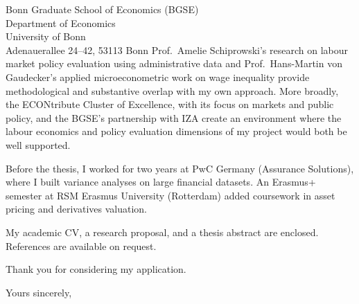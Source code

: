\documentclass[a4paper,11pt]{letter}
\begin{document}
\begin{letter}{%
    Bonn Graduate School of Economics (BGSE) \\
    Department of Economics \\
    University of Bonn \\
    Adenauerallee 24--42, 53113 Bonn
}
Prof.\ Amelie Schiprowski's research on labour market policy evaluation using administrative data and Prof.\ Hans-Martin von Gaudecker's applied microeconometric work on wage inequality provide methodological and substantive overlap with my own approach. More broadly, the ECONtribute Cluster of Excellence, with its focus on markets and public policy, and the BGSE's partnership with IZA create an environment where the labour economics and policy evaluation dimensions of my project would both be well supported.

Before the thesis, I worked for two years at PwC Germany (Assurance Solutions), where I built variance analyses on large financial datasets. An Erasmus+ semester at RSM Erasmus University (Rotterdam) added coursework in asset pricing and derivatives valuation.

My academic CV, a research proposal, and a thesis abstract are enclosed. References are available on request.

Thank you for considering my application.

\closing{Yours sincerely,}

\end{letter}
\end{document}
